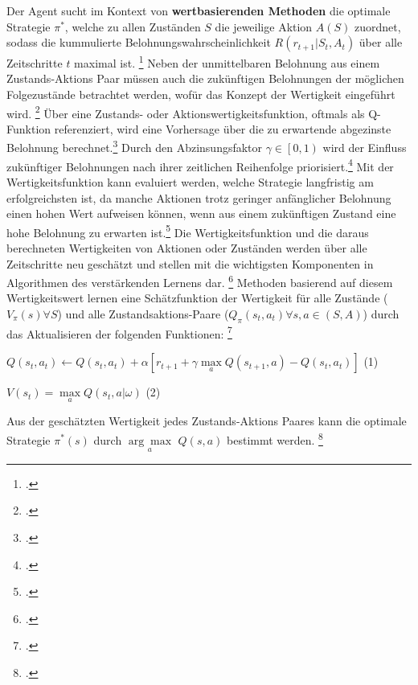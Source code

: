Der Agent sucht im Kontext von \textbf{wertbasierenden Methoden} die optimale Strategie $\pi^{*}$, welche zu allen Zuständen $S$ die jeweilige Aktion $A(S)$ zuordnet, sodass die kummulierte Belohnungswahrscheinlichkeit $R(r_{t+1}|S_{t},A_{t})$ über alle Zeitschritte $t$ maximal ist. \footcite[Vgl.][S. 2]{Reda.2020}
Neben der unmittelbaren Belohnung aus einem Zustands-Aktions Paar müssen auch die zukünftigen Belohnungen der möglichen Folgezustände betrachtet werden, wofür das Konzept der Wertigkeit eingeführt wird. \footcite[Vgl.][S. 3]{Wang.2020}
Über eine Zustands- oder Aktionswertigkeitsfunktion, oftmals als Q-Funktion referenziert, wird eine Vorhersage über die zu erwartende abgezinste Belohnung berechnet.\footcite[Vgl.][S. 5]{Li.2019}
Durch den Abzinsungsfaktor $\gamma \in \left[0,1\right)$ wird der Einfluss zukünftiger Belohnungen nach ihrer zeitlichen Reihenfolge priorisiert.\footcite[Vgl][S. 5]{Li.2019}
Mit der Wertigkeitsfunktion kann evaluiert werden, welche Strategie langfristig am erfolgreichsten ist, da manche Aktionen trotz geringer anfänglicher Belohnung einen hohen Wert aufweisen können, wenn aus einem zukünftigen Zustand eine hohe Belohnung zu erwarten ist.\footcite[Vgl.][S. 6]{Sutton.2018}
Die Wertigkeitsfunktion und die daraus berechneten Wertigkeiten von Aktionen oder Zuständen werden über alle Zeitschritte neu geschätzt und stellen mit die wichtigsten Komponenten in Algorithmen des verstärkenden Lernens dar. \footcite[Vgl.][S. 6f.]{Sutton.2018}
Methoden basierend auf diesem Wertigkeitswert lernen eine Schätzfunktion der Wertigkeit für alle Zustände ($V_{\pi}(s) \forall S$) und alle Zustandsaktions-Paare ($Q_{\pi}(s_{t},a_{t}) \forall s,a \in (S,A)$) durch das Aktualisieren der folgenden Funktionen: \footcite[Vgl.][S. 2]{Zhang.2018}
\begin{description}
    \item \begin{center} $Q(s_{t}, a_{t}) \leftarrow Q(s_{t}, a_{t}) + \alpha\left[r_{t+1} + \gamma\max\limits_{a}Q(s_{t+1},a)-Q(s_{t},a_{t})\right]$ (1) \end{center}
    \item \begin{center} $V(s_{t}) = \max\limits_{a}Q(s_{t},a|\omega)$ (2) \end{center}
\end{description}
Aus der geschätzten Wertigkeit jedes Zustands-Aktions Paares kann die optimale Strategie $\pi^{*}(s)$ durch $\underset{a}{\arg\max}$ $Q(s,a)$ bestimmt werden. \footcite[Vgl.][S. 2]{Zhang.2018}

